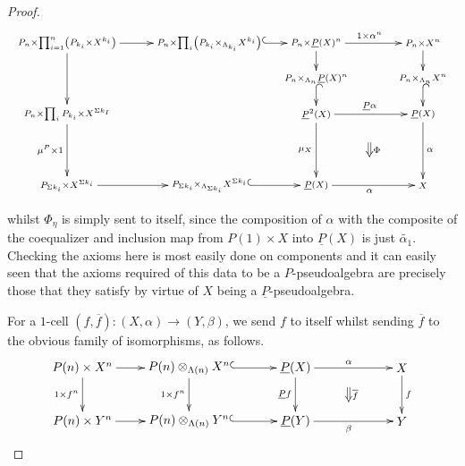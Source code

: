 \begin{proof}
    \[
        \xy
            (-10,0)*+{\scriptstyle P_n \times \prod_{i=1}^n\left(P_{k_i} \times X^{k_i}\right)}="00";
            (30,0)*+{\scriptstyle P_n \times \prod_i \left( P_{k_i} \times_{\Lambda_{k_i}} X^{k_i} \right)}="10";
            (60,0)*+{\scriptstyle P_n \times \underline{P}(X)^n}="20";
            (90,0)*+{\scriptstyle P_n \times X^n}="30";
            (-10,-20)*+{\scriptstyle P_n \times \prod_{i} P_{k_i} \times X^{\Sigma k_I}}="01";
            (-10,-40)*+{\scriptstyle P_{\Sigma k_i} \times X^{\Sigma k_{i}}}="02";
            (60,-10)*+{\scriptstyle P_n \times_{\Lambda_n} \underline{P}(X)^n}="21";
            (60,-20)*+{\scriptstyle \underline{P}^2(X)}="22";
            (90,-10)*+{\scriptstyle P_n \times_{\Lambda_n} X^n}="31";
            (90,-20)*+{\scriptstyle \underline{P}(X)}="32";
            (30,-40)*+{\scriptstyle P_{\Sigma k_i} \times_{\Lambda_{\Sigma k_i}} X^{\Sigma k_i}}="12";
            (60,-40)*+{\scriptstyle \underline{P}(X)}="23";
            (90,-40)*+{\scriptstyle X}="33";
            {\ar "00" ; "10"};
            {\ar "00" ; "01"};
            {\ar_{\mu^P \times 1} "01" ; "02"};
            {\ar@{^{(}->} "10" ; "20"};
            {\ar "20" ; "21"};
            {\ar^{1 \times \alpha^n} "20" ; "30"};
            {\ar "30" ; "31"};
            {\ar@{^{(}->} "21" ; "22"};
            {\ar^{\underline{P}\alpha} "22" ; "32"};
            {\ar@{^{(}->} "31" ; "32"};
            {\ar_{\mu_X} "22" ; "23"};
            {\ar_{\alpha} "23" ; "33"};
            {\ar^{\alpha} "32" ; "33"};
            {\ar "02" ; "12"};
            {\ar@{^{(}->} "12" ; "23"};
            {\ar@{=>}^{\Phi} (75,-28) ; (75,-32)};
        \endxy
    \]

whilst $\Phi_\eta$ is simply sent to itself, since the composition of $\alpha$ with the composite of the coequalizer and inclusion map from $P(1) \times X$ into $\underline{P}(X)$ is just $\tilde{\alpha_1}$. Checking the axioms here is most easily done on components and it can easily seen that the axioms required of this data to be a $P$-pseudoalgebra are precisely those that they satisfy by virtue of $X$ being a $\underline{P}$-pseudoalgebra.

For a $1$-cell $(f,\overline{f}) \colon (X, \alpha) \rightarrow (Y, \beta)$, we send $f$ to itself whilst sending $\overline{f}$ to the obvious family of isomorphisms, as follows.
    \[
        \xy
            (-30,0)*+{P(n) \times X^n}="-10";
            (-30,-15)*+{P(n) \times Y^n}="-11";
            (0,0)*+{\coeq{P}{X}{\Lambda}{n}}="00";
            (30,0)*+{\underline{P}(X)}="10";
            (60,0)*+{X}="20";
            (0,-15)*+{\coeq{P}{Y}{\Lambda}{n}}="01";
            (30,-15)*+{\underline{P}(Y)}="11";
            (60,-15)*+{Y}="21";
            {\ar@{^{(}->} "00" ; "10"};
            {\ar^{\alpha} "10" ; "20"};
            {\ar_{1 \times f^n} "00" ; "01"};
            {\ar_{\underline{P}f} "10" ; "11"};
            {\ar^{f} "20" ; "21"};
            {\ar@{^{(}->} "01" ; "11"};
            {\ar_{\beta} "11" ; "21"};
            {\ar "-10" ; "00"};
            {\ar "-11" ; "01"};
            {\ar_{1 \times f^n} "-10" ; "-11"};
            {\ar@{=>}^{\overline{f}} (45,-5.5) ; (45,-9.5)};
        \endxy
    \]


\end{proof}
